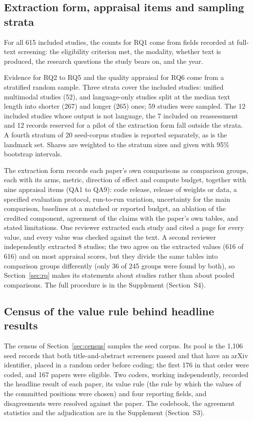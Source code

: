 \subsection{Extraction form, appraisal items and sampling strata}
\label{sec:method-extraction}
For all 615 included studies, the counts for RQ1 come from fields recorded at full-text screening: the eligibility criterion met, the modality, whether text is produced, the research questions the study bears on, and the year.

Evidence for RQ2 to RQ5 and the quality appraisal for RQ6 come from a stratified random sample. Three strata cover the included studies: unified multimodal studies (52), and language-only studies split at the median text length into shorter (267) and longer (265) ones; 59 studies were sampled. The 12 included studies whose output is not language, the 7 included on reassessment and 12 records reserved for a pilot of the extraction form fall outside the strata. A fourth stratum of 20 seed-corpus studies is reported separately, as is the landmark set. Shares are weighted to the stratum sizes and given with 95\% bootstrap intervals.

The extraction form records each paper's own comparisons as comparison groups, each with its arms, metric, direction of effect and compute budget, together with nine appraisal items (QA1 to QA9): code release, release of weights or data, a specified evaluation protocol, run-to-run variation, uncertainty for the main comparison, baselines at a matched or reported budget, an ablation of the credited component, agreement of the claims with the paper's own tables, and stated limitations. One reviewer extracted each study and cited a page for every value, and every value was checked against the text. A second reviewer independently extracted 8 studies; the two agree on the extracted values (616 of 616) and on most appraisal scores, but they divide the same tables into comparison groups differently (only 36 of 245 groups were found by both), so Section~\ref{sec:rq} makes its statements about studies rather than about pooled comparisons. The full procedure is in the Supplement (Section~S4).

\subsection{Census of the value rule behind headline results}
\label{sec:census-method}
The census of Section~\ref{sec:census} samples the seed corpus. Its pool is the 1,106 seed records that both title-and-abstract screeners passed and that have an arXiv identifier, placed in a random order before coding; the first 176 in that order were coded, and 167 papers were eligible. Two coders, working independently, recorded the headline result of each paper, its value rule (the rule by which the values of the committed positions were chosen) and four reporting fields, and disagreements were resolved against the paper. The codebook, the agreement statistics and the adjudication are in the Supplement (Section~S3).

